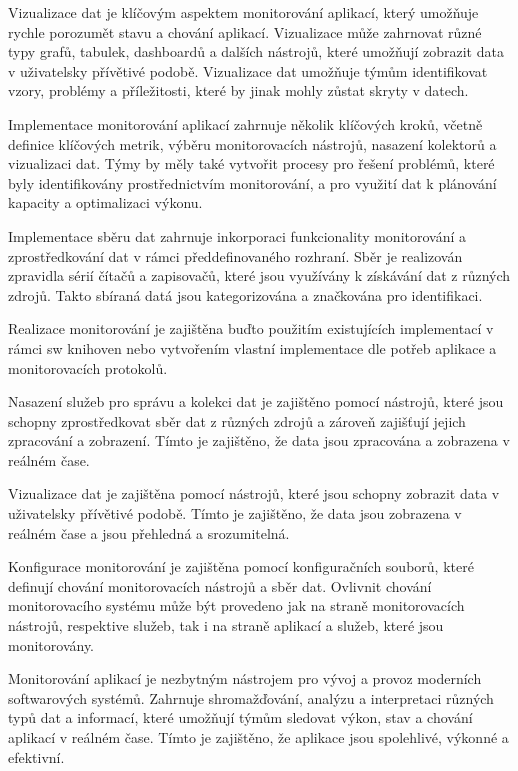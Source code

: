 
Vizualizace dat je klíčovým aspektem monitorování aplikací, který umožňuje rychle porozumět stavu a chování aplikací. Vizualizace může zahrnovat různé typy grafů, tabulek, dashboardů a dalších nástrojů, které umožňují zobrazit data v uživatelsky přívětivé podobě. Vizualizace dat umožňuje týmům identifikovat vzory, problémy a příležitosti, které by jinak mohly zůstat skryty v datech.


Implementace monitorování aplikací zahrnuje několik klíčových kroků, včetně definice klíčových metrik, výběru monitorovacích nástrojů, nasazení kolektorů a vizualizaci dat. Týmy by měly také vytvořit procesy pro řešení problémů, které byly identifikovány prostřednictvím monitorování, a pro využití dat k plánování kapacity a optimalizaci výkonu.


Implementace sběru dat zahrnuje inkorporaci funkcionality monitorování a zprostředkování dat v rámci předdefinovaného rozhraní. Sběr je realizován zpravidla sérií čítačů a zapisovačů, které jsou využívány k získávání dat z různých zdrojů. Takto sbíraná datá jsou kategorizována a značkována pro identifikaci.

Realizace monitorování je zajištěna buďto použitím existujících implementací v rámci sw knihoven nebo vytvořením vlastní implementace dle potřeb aplikace a monitorovacích protokolů.


Nasazení služeb pro správu a kolekci dat je zajištěno pomocí nástrojů, které jsou schopny zprostředkovat sběr dat z různých zdrojů a zároveň zajišťují jejich zpracování a zobrazení. Tímto je zajištěno, že data jsou zpracována a zobrazena v reálném čase.


Vizualizace dat je zajištěna pomocí nástrojů, které jsou schopny zobrazit data v uživatelsky přívětivé podobě. Tímto je zajištěno, že data jsou zobrazena v reálném čase a jsou přehledná a srozumitelná.


Konfigurace monitorování je zajištěna pomocí konfiguračních souborů, které definují chování monitorovacích nástrojů a sběr dat. Ovlivnit chování monitorovacího systému může být provedeno jak na straně monitorovacích nástrojů, respektive služeb, tak i na straně aplikací a služeb, které jsou monitorovány.


Monitorování aplikací je nezbytným nástrojem pro vývoj a provoz moderních softwarových systémů. Zahrnuje shromažďování, analýzu a interpretaci různých typů dat a informací, které umožňují týmům sledovat výkon, stav a chování aplikací v reálném čase. Tímto je zajištěno, že aplikace jsou spolehlivé, výkonné a efektivní.
